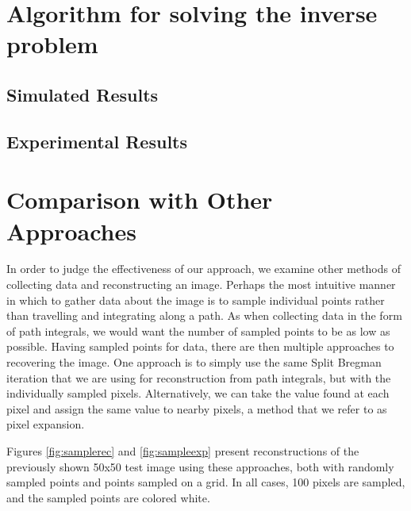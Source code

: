 \documentclass[english]{article}\usepackage[]{graphicx}\usepackage[]{color}
\begin{document}

\section{Algorithm for solving the inverse problem}

\subsection{Simulated Results}
\label{sec:simresults}
\subsection{Experimental Results}

\section{Comparison with Other Approaches}

In order to judge the effectiveness of our approach, we examine other methods of collecting data and reconstructing an image. Perhaps the most intuitive manner in which to gather data about the image is to sample individual points rather than travelling and integrating along a path. As when collecting data in the form of path integrals, we would want the number of sampled points to be as low as possible. Having sampled points for data, there are then multiple approaches to recovering the image. One approach is to simply use the same Split Bregman iteration that we are using for reconstruction from path integrals, but with the individually sampled pixels. Alternatively, we can take the value found at each pixel and assign the same value to nearby pixels, a method that we refer to as pixel expansion.

Figures \ref{fig:samplerec} and \ref{fig:sampleexp} present reconstructions of the previously shown 50x50 test image using these approaches, both with randomly sampled points and points sampled on a grid. In all cases, 100 pixels are sampled, and the sampled points are colored white.
\end{document}
